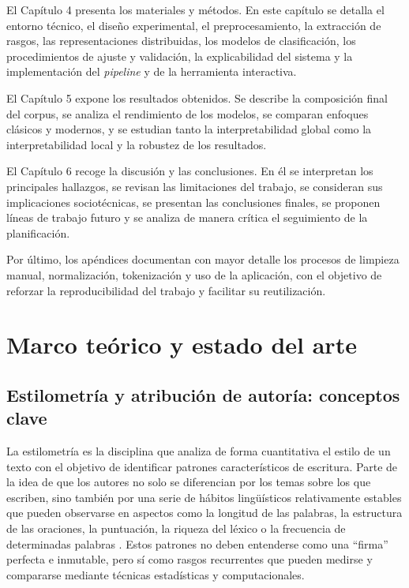 \documentclass[IB]{TFUOC}%
\begin{document}
El Capítulo 4 presenta los materiales y métodos. En este capítulo se detalla el entorno técnico, el diseño experimental, el preprocesamiento, la extracción de rasgos, las representaciones distribuidas, los modelos de clasificación, los procedimientos de ajuste y validación, la explicabilidad del sistema y la implementación del \textit{pipeline} y de la herramienta interactiva.

El Capítulo 5 expone los resultados obtenidos. Se describe la composición final del corpus, se analiza el rendimiento de los modelos, se comparan enfoques clásicos y modernos, y se estudian tanto la interpretabilidad global como la interpretabilidad local y la robustez de los resultados.

El Capítulo 6 recoge la discusión y las conclusiones. En él se interpretan los principales hallazgos, se revisan las limitaciones del trabajo, se consideran sus implicaciones sociotécnicas, se presentan las conclusiones finales, se proponen líneas de trabajo futuro y se analiza de manera crítica el seguimiento de la planificación.

Por último, los apéndices documentan con mayor detalle los procesos de limpieza manual, normalización, tokenización y uso de la aplicación, con el objetivo de reforzar la reproducibilidad del trabajo y facilitar su reutilización.

\chapter{Marco teórico y estado del arte}

\section{Estilometría y atribución de autoría: conceptos clave}

La estilometría es la disciplina que analiza de forma cuantitativa el estilo de un texto con el objetivo de identificar patrones característicos de escritura. Parte de la idea de que los autores no solo se diferencian por los temas sobre los que escriben, sino también por una serie de hábitos lingüísticos relativamente estables que pueden observarse en aspectos como la longitud de las palabras, la estructura de las oraciones, la puntuación, la riqueza del léxico o la frecuencia de determinadas palabras \cite{stamatatos2009survey}. Estos patrones no deben entenderse como una ``firma'' perfecta e inmutable, pero sí como rasgos recurrentes que pueden medirse y compararse mediante técnicas estadísticas y computacionales.
\end{document}
